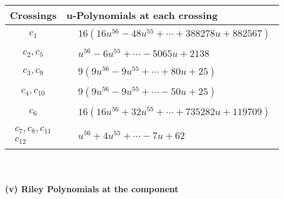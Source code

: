 \documentclass[1p]{elsarticle_modified}
\theoremstyle{definition}
\begin{document}
\begin{tabular}{m{50pt}|m{274pt}}
Crossings & \hspace{64pt}u-Polynomials at each crossing \\
\hline $$\begin{aligned}c_{1}\end{aligned}$$&$\begin{aligned}
&16(16 u^{56}-48 u^{55}+\cdots+388278 u+882567)
\end{aligned}$\\
\hline $$\begin{aligned}c_{2},c_{5}\end{aligned}$$&$\begin{aligned}
&u^{56}-6 u^{55}+\cdots-5065 u+2138
\end{aligned}$\\
\hline $$\begin{aligned}c_{3},c_{9}\end{aligned}$$&$\begin{aligned}
&9(9 u^{56}-9 u^{55}+\cdots+80 u+25)
\end{aligned}$\\
\hline $$\begin{aligned}c_{4},c_{10}\end{aligned}$$&$\begin{aligned}
&9(9 u^{56}-9 u^{55}+\cdots-50 u+25)
\end{aligned}$\\
\hline $$\begin{aligned}c_{6}\end{aligned}$$&$\begin{aligned}
&16(16 u^{56}+32 u^{55}+\cdots+735282 u+119709)
\end{aligned}$\\
\hline $$\begin{aligned}c_{7},c_{8},c_{11}\\c_{12}\end{aligned}$$&$\begin{aligned}
&u^{56}+4 u^{55}+\cdots-7 u+62
\end{aligned}$\\
\hline
\end{tabular}\\~\\
\newpage\renewcommand{\arraystretch}{1}
\flushleft \textbf{(v) Riley Polynomials at the component}\newline \\
\end{document}
